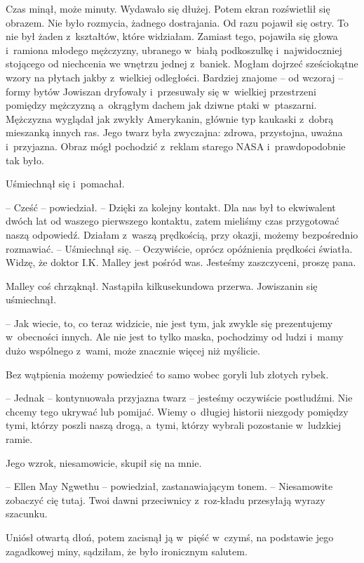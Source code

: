 \documentclass[oneside,polish,11pt,sfheadings]{mwbk}
\begin{document}
Czas minął, może minuty. Wydawało się dłużej. Potem ekran rozświetlił
się obrazem. Nie było rozmycia, żadnego dostrajania. Od razu pojawił się
ostry. To nie był żaden z~kształtów, które widziałam. Zamiast tego,
pojawiła się głowa i~ramiona młodego mężczyzny, ubranego w~białą
podkoszulkę i~najwidoczniej stojącego od niechcenia we wnętrzu jednej z~baniek. Mogłam dojrzeć sześciokątne wzory na płytach jakby z~wielkiej
odległości. Bardziej znajome -- od wczoraj -- formy bytów Jowiszan
dryfowały i~przesuwały się w~wielkiej przestrzeni pomiędzy mężczyzną a~okrągłym dachem jak dziwne ptaki w~ptaszarni. Mężczyzna wyglądał jak
zwykły Amerykanin, głównie typ kaukaski z~dobrą mieszanką innych ras.
Jego twarz była zwyczajna: zdrowa, przystojna, uważna i~przyjazna. Obraz
mógł pochodzić z~reklam starego NASA i~prawdopodobnie tak było.

Uśmiechnął się i~pomachał. 

-- Cześć -- powiedział. -- Dzięki za kolejny
kontakt. Dla nas był to ekwiwalent dwóch lat od waszego pierwszego
kontaktu, zatem mieliśmy czas przygotować naszą odpowiedź. Działam z~waszą prędkością, przy okazji, możemy bezpośrednio rozmawiać. -- Uśmiechnął się. -- Oczywiście, oprócz opóźnienia prędkości światła.
Widzę, że doktor I.K. Malley jest pośród was. Jesteśmy zaszczyceni,
proszę pana.

Malley coś chrząknął. Nastąpiła kilkusekundowa przerwa. Jowiszanin się
uśmiechnął.

-- Jak wiecie, to, co teraz widzicie, nie jest tym, jak zwykle się
prezentujemy w~obecności innych. Ale nie jest to tylko maska, pochodzimy
od ludzi i~mamy dużo wspólnego z~wami, może znacznie więcej niż
myślicie.

Bez wątpienia możemy powiedzieć to samo wobec goryli lub złotych rybek.

-- Jednak -- kontynuowała przyjazna twarz -- jesteśmy oczywiście
postludźmi. Nie chcemy tego ukrywać lub pomijać. Wiemy o~długiej
historii niezgody pomiędzy tymi, którzy poszli naszą drogą, a~tymi,
którzy wybrali pozostanie w~ludzkiej ramie.

Jego wzrok, niesamowicie, skupił się na mnie. 

-- Ellen May Ngwethu -- powiedział, zastanawiającym tonem. -- Niesamowite zobaczyć cię tutaj.
Twoi dawni przeciwnicy z~roz-kładu przesyłają wyrazy szacunku.

Uniósł otwartą dłoń, potem zacisnął ją w~pięść w~czymś, na podstawie
jego zagadkowej miny, sądziłam, że było ironicznym salutem.
\end{document}
